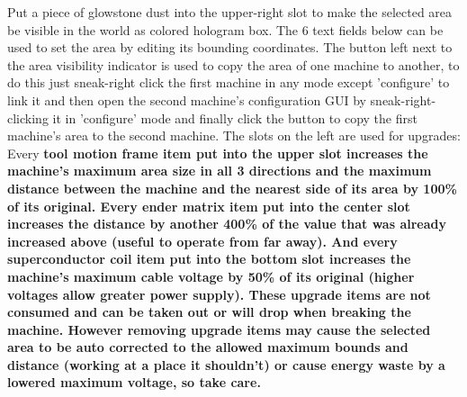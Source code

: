 \documentclass[11pt]{article} %
\begin{document}
Put a piece of glowstone dust into the upper-right slot to make the selected area be visible in the world as colored hologram box. The 6 text fields below can be used to set the area by editing its bounding coordinates. The button left next to the area visibility indicator is used to copy the area of one machine to another, to do this just sneak-right click the first machine in any mode except 'configure' to link it and then open the second machine's configuration GUI by sneak-right-clicking it in 'configure' mode and finally click the button to copy the first machine's area to the second machine. The slots on the left are used for upgrades: Every \bf tool motion frame \rm item put into the upper slot increases the machine's maximum area size in all 3 directions and the maximum distance between the machine and the nearest side of its area by 100\% of its original. Every \bf ender matrix \rm item put into the center slot increases the distance by another 400\% of the value that was already increased above (useful to operate from far away). And every \bf superconductor coil \rm item put into the bottom slot increases the machine's maximum cable voltage by 50\% of its original (higher voltages allow greater power supply). These upgrade items are not consumed and can be taken out or will drop when breaking the machine. However removing upgrade items may cause the selected area to be auto corrected to the allowed maximum bounds and distance (working at a place it shouldn't) or cause energy waste by a lowered maximum voltage, so take care.
\end{document}
